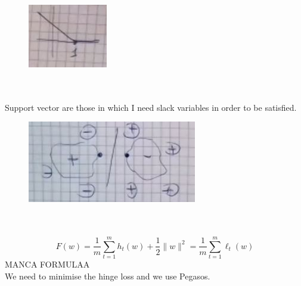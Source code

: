 \documentclass[../main.tex]{subfiles}
\begin{document}
\begin{figure}[h]
    \centering
    \includegraphics[width=0.2\linewidth]{../img/lez20-img2.JPG}
    \caption{}
\end{figure}\\
\\
Support vector are those in which I need slack variables in order to be satisfied.
\begin{figure}[h]
    \centering
    \includegraphics[width=0.5\linewidth]{../img/lez20-img3.JPG}
    \caption{}
\end{figure}\\
\\
$$
F(w) = \frac{1}{m} \sum_{t=1}^m h_t(w) + \frac{1}{2} \| w\|^2  = \frac{1}{m} \sum_{t=1}^m \ell_t(w)
$$
MANCA FORMULAA\\
We need to minimise the hinge loss and we use Pegasos.
\end{document}
